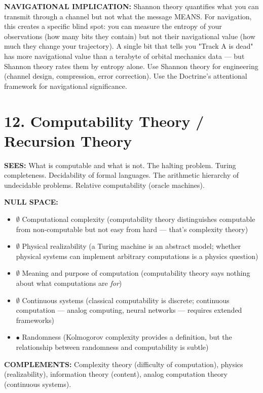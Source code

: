 \textbf{NAVIGATIONAL IMPLICATION:} Shannon theory quantifies what you can transmit through a channel but not what the message MEANS. For navigation, this creates a specific blind spot: you can measure the entropy of your observations (how many bits they contain) but not their navigational value (how much they change your trajectory). A single bit that tells you "Track A is dead" has more navigational value than a terabyte of orbital mechanics data — but Shannon theory rates them by entropy alone. Use Shannon theory for engineering (channel design, compression, error correction). Use the Doctrine's attentional framework for navigational significance.


\bigskip\noindent\makebox[\textwidth]{\color{rulegray}\rule{5cm}{0.3pt}}\bigskip


\section*{12. Computability Theory / Recursion Theory}


\textbf{SEES:} What is computable and what is not. The halting problem. Turing completeness. Decidability of formal languages. The arithmetic hierarchy of undecidable problems. Relative computability (oracle machines).


\textbf{NULL SPACE:}

\begin{itemize}[nosep,leftmargin=*]
  \item $\emptyset$ Computational complexity (computability theory distinguishes computable from non-computable but not easy from hard — that's complexity theory)
  \item $\emptyset$ Physical realizability (a Turing machine is an abstract model; whether physical systems can implement arbitrary computations is a physics question)
  \item $\emptyset$ Meaning and purpose of computation (computability theory says nothing about what computations are \textit{for})
  \item $\emptyset$ Continuous systems (classical computability is discrete; continuous computation — analog computing, neural networks — requires extended frameworks)
  \item $\bullet$ Randomness (Kolmogorov complexity provides a definition, but the relationship between randomness and computability is subtle)
\end{itemize}


\textbf{COMPLEMENTS:} Complexity theory (difficulty of computation), physics (realizability), information theory (content), analog computation theory (continuous systems).


